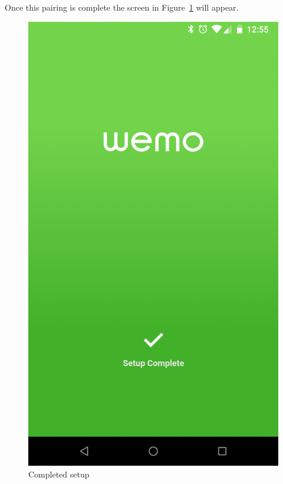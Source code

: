 Once this pairing is complete the screen in Figure~\ref{fig:completedSetup} will appear.
\begin{figure}[H]
\centering
\includegraphics[scale=0.09]{figs/wemoApp/setupComplete.png}
\caption{Completed setup}
\label{fig:completedSetup}
\end{figure}

